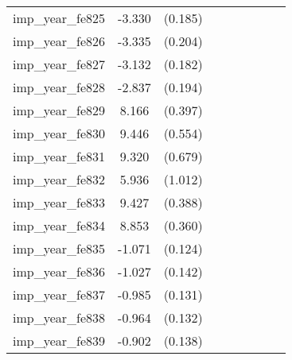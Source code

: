 {\begin{tabular}{l*{4}{cc}}
imp\_year\_fe825&   -3.330\sym{***}&  (0.185)&                  &         &                  &         &                  &         \\
imp\_year\_fe826&   -3.335\sym{***}&  (0.204)&                  &         &                  &         &                  &         \\
imp\_year\_fe827&   -3.132\sym{***}&  (0.182)&                  &         &                  &         &                  &         \\
imp\_year\_fe828&   -2.837\sym{***}&  (0.194)&                  &         &                  &         &                  &         \\
imp\_year\_fe829&    8.166\sym{***}&  (0.397)&                  &         &                  &         &                  &         \\
imp\_year\_fe830&    9.446\sym{***}&  (0.554)&                  &         &                  &         &                  &         \\
imp\_year\_fe831&    9.320\sym{***}&  (0.679)&                  &         &                  &         &                  &         \\
imp\_year\_fe832&    5.936\sym{***}&  (1.012)&                  &         &                  &         &                  &         \\
imp\_year\_fe833&    9.427\sym{***}&  (0.388)&                  &         &                  &         &                  &         \\
imp\_year\_fe834&    8.853\sym{***}&  (0.360)&                  &         &                  &         &                  &         \\
imp\_year\_fe835&   -1.071\sym{***}&  (0.124)&                  &         &                  &         &                  &         \\
imp\_year\_fe836&   -1.027\sym{***}&  (0.142)&                  &         &                  &         &                  &         \\
imp\_year\_fe837&   -0.985\sym{***}&  (0.131)&                  &         &                  &         &                  &         \\
imp\_year\_fe838&   -0.964\sym{***}&  (0.132)&                  &         &                  &         &                  &         \\
imp\_year\_fe839&   -0.902\sym{***}&  (0.138)&                  &         &                  &         &                  &         \\

\end{tabular}}
